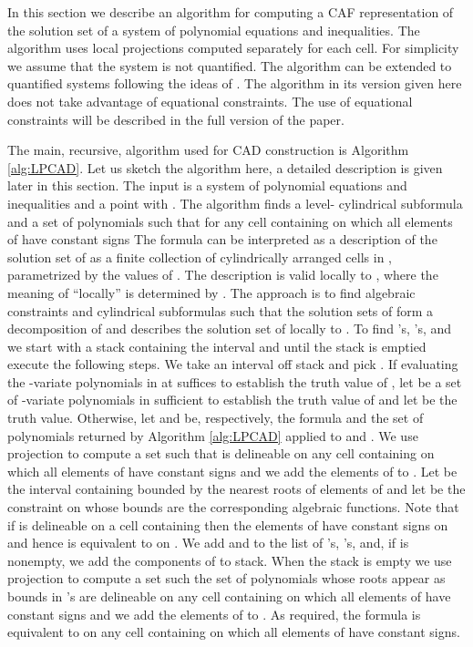 \documentclass[english]{amsart}
\numberwithin{equation}{section}
\numberwithin{figure}{section}
\begin{document}
In this section we describe an algorithm for computing a CAF representation
of the solution set of a system of polynomial equations and inequalities.
The algorithm uses local projections computed separately for each
cell. For simplicity we assume that the system is not quantified.
The algorithm can be extended to quantified systems following the
ideas of \cite{CH}. The algorithm in its version given here does
not take advantage of equational constraints. The use of equational
constraints will be described in the full version of the paper.

The main, recursive, algorithm used for CAD construction is Algorithm
\ref{alg:LPCAD}. Let us sketch the algorithm here, a detailed description
is given later in this section. The input is\emph{ }a system \emph{
}of polynomial equations and inequalities and a point 
with . The algorithm finds a level- cylindrical
subformula  and a set of polynomials \emph{}
such that for any cell  containing 
on which all elements of  have constant signs\emph{ }
The formula  can be interpreted as a description of the solution
set of  as a finite collection of cylindrically arranged cells
in , parametrized by the values of .
The description is valid locally to , where the meaning
of {}``locally'' is determined by . The approach is to find
algebraic constraints 
 and cylindrical subformulas  such that the solution
sets of 
form a decomposition of  and  describes the solution
set of  locally to .
To find 's, 's, and  we start with a stack containing
the interval  and until the stack is emptied execute
the following steps. We take an interval  off stack and pick .
If evaluating the -variate polynomials in  at 
suffices to establish the truth value of , let  be a set of
-variate polynomials in  sufficient to establish the truth
value of  and let  be the truth value. Otherwise, let 
and  be, respectively, the formula and the set of polynomials
returned by Algorithm \ref{alg:LPCAD} applied to  and .
We use projection to compute a set \emph{}
such that  is delineable on any cell containing 
on which all elements of  have constant signs and we add the elements
of  to . Let  be the interval containing  bounded
by the nearest roots of elements of  and let  be the constraint
on  whose bounds are the corresponding algebraic functions.
Note that if  is delineable on a cell  containing 
then the elements of  have constant signs on 
and hence  is equivalent to  on . We add  and 
to the list of 's, 's, and, if  is nonempty,
we add the components of  to stack. When the stack
is empty we use projection to compute a set \emph{}
such the set of polynomials whose roots appear as bounds in 's
are delineable on any cell containing  on which all
elements of  have constant signs and we add the elements of 
to . As required, the formula 
is equivalent to  on any cell containing  on which
all elements of  have constant signs. 
\end{document}
